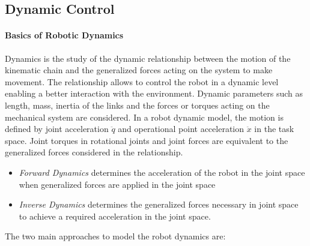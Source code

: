 \subsection{Dynamic Control}

\paragraph{Basics of Robotic Dynamics}
Dynamics is the study of the dynamic relationship between the motion of the kinematic chain and the generalized forces acting on the system to make movement. The relationship allows to control the robot in a dynamic level enabling a better interaction with the environment. Dynamic parameters such as length, mass, inertia of the links and the forces or torques acting on the mechanical system are considered. In a robot dynamic model, the motion is defined by joint  acceleration $\ddot{q}$ and operational point acceleration $\ddot{x}$ in the task space. Joint torques in rotational joints and joint forces are equivalent to the generalized forces considered in the relationship.

\begin{itemize}
    \item \textit{Forward Dynamics} determines the acceleration of the robot in the joint space when generalized forces are applied in the joint space
    \item \textit{Inverse Dynamics} determines the generalized forces necessary in joint space to achieve a required acceleration in the joint space.
\end{itemize}

The two main approaches to model the robot dynamics are:

